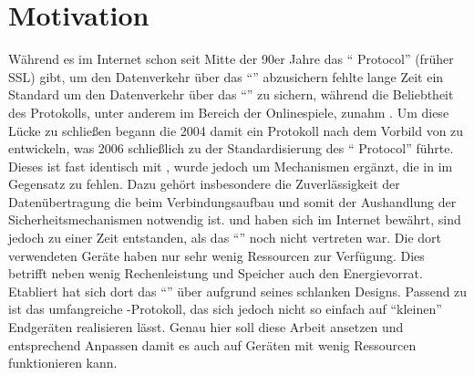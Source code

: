 \section{Motivation}
Während es im Internet schon seit Mitte der 90er Jahre das  "` Protocol"' \cite{rfc5246} (früher SSL) gibt, um den Datenverkehr
über das "`"' abzusichern fehlte lange Zeit ein Standard um den Datenverkehr über das "`"' zu sichern, während die
Beliebtheit des Protokolls, unter anderem im Bereich der Onlinespiele, zunahm \cite[Kapitel 1]{rfc6347}. Um diese Lücke zu schließen begann
die  2004 damit ein Protokoll nach dem Vorbild von  zu entwickeln, was 2006 schließlich zu der Standardisierung des
"` Protocol"' \cite{rfc6347} führte. Dieses ist fast identisch mit , wurde jedoch um Mechanismen ergänzt, die in 
im Gegensatz zu  fehlen. Dazu gehört insbesondere die Zuverlässigkeit der Datenübertragung die beim Verbindungsaufbau und somit der
Aushandlung der Sicherheitsmechanismen notwendig ist.  und  haben sich im Internet bewährt, sind jedoch zu einer Zeit
entstanden, als das "`"' noch nicht vertreten war. Die dort verwendeten Geräte haben nur sehr wenig Ressourcen zur Verfügung.
Dies betrifft neben wenig Rechenleistung und Speicher auch den Energievorrat. Etabliert hat sich dort das "`"' \cite{draftcoap}
über  aufgrund seines schlanken Designs. Passend zu  ist das umfangreiche -Protokoll, das sich jedoch nicht so
einfach auf "`kleinen"' Endgeräten realisieren lässt. Genau hier soll diese Arbeit ansetzen und  entsprechend Anpassen damit es
auch auf Geräten mit wenig Ressourcen funktionieren kann.